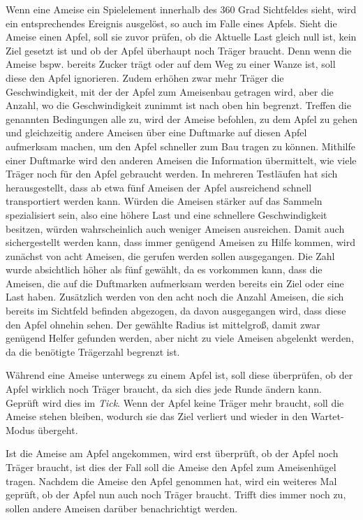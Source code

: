 
Wenn eine Ameise ein Spielelement innerhalb des 360 Grad Sichtfeldes sieht, wird ein entsprechendes Ereignis ausgelöst, so auch im Falle eines Apfels. Sieht die Ameise einen Apfel, soll sie zuvor prüfen, ob die Aktuelle Last gleich null ist, kein Ziel gesetzt ist und ob der Apfel überhaupt noch Träger braucht. Denn wenn die Ameise bspw. bereits Zucker trägt oder auf dem Weg zu einer Wanze ist, soll diese den Apfel ignorieren. Zudem erhöhen zwar mehr Träger die Geschwindigkeit, mit der der Apfel zum Ameisenbau getragen wird, aber die Anzahl, wo die Geschwindigkeit zunimmt ist nach oben hin begrenzt. Treffen die genannten Bedingungen alle zu, wird der Ameise befohlen, zu dem Apfel zu gehen und gleichzeitig andere Ameisen über eine Duftmarke auf diesen Apfel aufmerksam machen, um den Apfel schneller zum Bau tragen zu können. Mithilfe einer Duftmarke wird den anderen Ameisen die Information übermittelt, wie viele Träger noch für den Apfel gebraucht werden. In mehreren Testläufen hat sich herausgestellt, dass ab etwa fünf Ameisen der Apfel ausreichend schnell transportiert werden kann. Würden die Ameisen stärker auf das Sammeln spezialisiert sein, also eine höhere Last und eine schnellere Geschwindigkeit besitzen, würden wahrscheinlich auch weniger Ameisen ausreichen. Damit auch sichergestellt werden kann, dass immer genügend Ameisen zu Hilfe kommen, wird zunächst von acht Ameisen, die gerufen werden sollen ausgegangen. Die Zahl wurde absichtlich höher als fünf gewählt, da es vorkommen kann, dass die Ameisen, die auf die Duftmarken aufmerksam werden bereits ein Ziel oder eine Last haben. Zusätzlich werden von den acht noch die Anzahl Ameisen, die sich bereits im Sichtfeld befinden abgezogen, da davon ausgegangen wird, dass diese den Apfel ohnehin sehen. Der gewählte Radius ist mittelgroß, damit zwar genügend Helfer gefunden werden, aber nicht zu viele Ameisen abgelenkt werden, da die benötigte Trägerzahl begrenzt ist.

Während eine Ameise unterwegs zu einem Apfel ist, soll diese überprüfen, ob der Apfel wirklich noch Träger braucht, da sich dies jede Runde ändern kann. Geprüft wird dies im \textit{Tick}. Wenn der Apfel keine Träger mehr braucht, soll die Ameise stehen bleiben, wodurch sie das Ziel verliert und wieder in den Wartet-Modus übergeht.

Ist die Ameise am Apfel angekommen, wird erst überprüft, ob der Apfel noch Träger braucht, ist dies der Fall soll die Ameise den Apfel zum Ameisenhügel tragen. Nachdem die Ameise den Apfel genommen hat, wird ein weiteres Mal geprüft, ob der Apfel nun auch noch Träger braucht. Trifft dies immer noch zu, sollen andere Ameisen darüber benachrichtigt werden.

